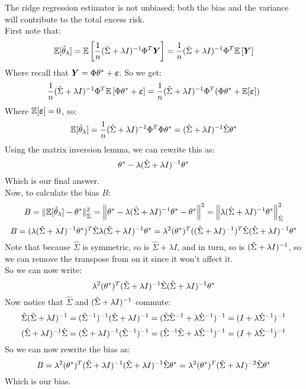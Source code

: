 \documentclass[12pt]{article}
\begin{document}
The ridge regression estimator is not
unbiased; both the bias and the variance
will contribute to the total excess risk. \\

First note that:
\[ \mathbb{E}[\hat{\theta}_\lambda]
= \mathbb{E}\left[ \dfrac{1}{n}(\hat{\Sigma} 
+ \lambda I)^{-1} \Phi^T \boldsymbol{Y} \right]
= \dfrac{1}{n}(\hat{\Sigma} 
+ \lambda I)^{-1} \Phi^T \mathbb{E}\left[ \boldsymbol{Y} \right] \]
Where recall that 
$\boldsymbol{Y} = \Phi \theta^* + \boldsymbol{\varepsilon}$.
So we get:
\[ \dfrac{1}{n}(\hat{\Sigma} 
+ \lambda I)^{-1} \Phi^T 
\mathbb{E}\left[ \Phi \theta^* + \boldsymbol{\varepsilon} \right] = 
\dfrac{1}{n}(\hat{\Sigma} 
+ \lambda I)^{-1} \Phi^T 
(\Phi \theta^* + \mathbb{E}[\boldsymbol{\varepsilon}]) \]
Where $\mathbb{E}[\boldsymbol{\varepsilon}] = 0$, so:
\[  \mathbb{E}[\hat{\theta}_\lambda] 
= \dfrac{1}{n}(\hat{\Sigma} 
+ \lambda I)^{-1} \Phi^T \Phi \theta^*
= (\hat{\Sigma} + \lambda I)^{-1} 
\hat{\Sigma} \theta^* \]
Using the matrix inversion lemma,
we can rewrite this as:
\[ \theta^* - 
\lambda(\hat{\Sigma} + \lambda I)^{-1} \theta^* \]
Which is our final answer. \\

Now, to calculate the bias $B$:
\[ B = \| \mathbb{E}[\hat{\theta}_\lambda] 
- \theta^* \|_{\hat{\Sigma}}^2
= \left\|  \theta^* - \lambda(\hat{\Sigma} 
+ \lambda I)^{-1} \theta^* - \theta^*  \right\|^2
= \left\| \lambda(\hat{\Sigma} 
+ \lambda I)^{-1} \theta^* \right\|_{\hat{\Sigma}}^2 \]
\[ B = (\lambda(\hat{\Sigma} 
+ \lambda I)^{-1} \theta^*)^T\hat{\Sigma}
\lambda(\hat{\Sigma} 
+ \lambda I)^{-1} \theta^*
= \lambda^2(\theta^*)^T
((\hat{\Sigma} + \lambda I)^{-1})^T\hat{\Sigma}
(\hat{\Sigma} + \lambda I)^{-1} \theta^*\]
Note that because $\hat{\Sigma}$
is symmetric, so is $\hat{\Sigma} + \lambda I$,
and in turn, so is $(\hat{\Sigma} + \lambda I)^{-1}$,
so we can remove the transpose from on it
since it won't affect it. \\
So we can now write:
\[ \lambda^2(\theta^*)^T
(\hat{\Sigma} + \lambda I)^{-1}\hat{\Sigma}
(\hat{\Sigma} + \lambda I)^{-1} \theta^* \]
Now notice that $\hat{\Sigma}$
and $(\hat{\Sigma} + \lambda I)^{-1}$ commute:
\[ \hat{\Sigma}(\hat{\Sigma} + \lambda I)^{-1}
= (\hat{\Sigma}^{-1})^{-1}
(\hat{\Sigma} + \lambda I)^{-1}
= (\hat{\Sigma}\hat{\Sigma}^{-1} 
+ \lambda \hat{\Sigma}^{-1})^{-1}
= (I + \lambda \hat{\Sigma}^{-1})^{-1} \]
\[ (\hat{\Sigma} + \lambda I)^{-1} \hat{\Sigma}
= (\hat{\Sigma} + \lambda I)^{-1} 
(\hat{\Sigma}^{-1})^{-1}
= (\hat{\Sigma}^{-1}\hat{\Sigma}
+ \lambda \hat{\Sigma}^{-1})^{-1}
= (I + \lambda \hat{\Sigma}^{-1})^{-1} \]
So we can now rewrite the bias as:
\[ B = \lambda^2(\theta^*)^T
(\hat{\Sigma} + \lambda I)^{-1}
(\hat{\Sigma} + \lambda I)^{-1} \hat{\Sigma} \theta^*
= \lambda^2(\theta^*)^T
(\hat{\Sigma} + \lambda I)^{-2}
\hat{\Sigma} \theta^* \]
Which is our bias. \\
\end{document}
